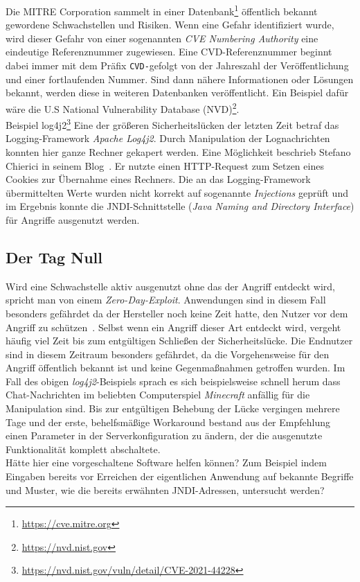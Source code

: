 Die MITRE Corporation sammelt in einer Datenbank\footnote{\url{https://cve.mitre.org}} öffentlich bekannt gewordene Schwachstellen und Risiken. Wenn eine Gefahr identifiziert wurde, wird dieser Gefahr von einer sogenannten \emph{CVE Numbering Authority} eine eindeutige Referenznummer zugewiesen. Eine CVD-Referenznummer beginnt dabei immer mit dem Präfix \glqq\verb=CVD-=\grqq gefolgt von der Jahreszahl der Veröffentlichung und einer fortlaufenden Nummer. Sind dann nähere Informationen oder Lösungen bekannt, werden diese in weiteren Datenbanken veröffentlicht. Ein Beispiel dafür wäre die U.S National Vulnerability Database (NVD)\footnote{\url{https://nvd.nist.gov}}.\\

\textcolor{bhtGray}{ Beispiel log4j2\footnote{\url{https://nvd.nist.gov/vuln/detail/CVE-2021-44228}}} Eine der größeren Sicherheitslücken der letzten Zeit betraf das Logging-Framework \emph{Apache Log4j2}. Durch Manipulation der Lognachrichten konnten hier ganze Rechner gekapert werden. Eine Möglichkeit beschrieb Stefano Chierici in seinem Blog~\cite{chierici2021}. Er nutzte einen HTTP-Request zum Setzen eines Cookies zur Übernahme eines Rechners. Die an das Logging-Framework übermittelten Werte wurden nicht korrekt auf sogenannte \emph{Injections} geprüft und im Ergebnis konnte die JNDI-Schnittstelle (\emph{Java Naming and Directory Interface}) für Angriffe ausgenutzt werden. \\

\subsection{Der Tag Null}

Wird eine Schwachstelle aktiv ausgenutzt ohne das der Angriff entdeckt wird, spricht man von einem \glqq\emph{Zero-Day-Exploit}\grqq. Anwendungen sind in diesem Fall besonders gefährdet da der Hersteller noch keine Zeit hatte, den Nutzer vor dem Angriff zu schützen~\cite{bsi0day}. Selbst wenn ein Angriff dieser Art entdeckt wird, vergeht häufig viel Zeit bis zum entgültigen Schließen der Sicherheitslücke. Die Endnutzer sind in diesem Zeitraum besonders gefährdet, da die Vorgehensweise für den Angriff öffentlich bekannt ist und keine Gegenmaßnahmen getroffen wurden. Im Fall des obigen \emph{log4j2}-Beispiels sprach es sich beispielsweise schnell herum dass Chat-Nachrichten im beliebten Computerspiel \emph{Minecraft} anfällig für die Manipulation sind. Bis zur entgültigen Behebung der Lücke vergingen mehrere Tage und der erste, behelfsmäßige Workaround bestand aus der Empfehlung einen Parameter in der Serverkonfiguration zu ändern, der die ausgenutzte Funktionalität komplett abschaltete.\\ Hätte hier eine vorgeschaltene Software helfen können? Zum Beispiel indem Eingaben bereits vor Erreichen der eigentlichen Anwendung auf bekannte Begriffe und Muster, wie die bereits erwähnten JNDI-Adressen, untersucht werden?

